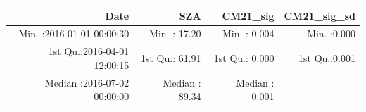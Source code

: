 \documentclass[
  10pt,
  a4paper,oneside]{article}
\begin{document}
\begin{longtable}[]{@{}rrrr@{}}
\toprule
\begin{minipage}[b]{0.33\columnwidth}\raggedleft
Date\strut
\end{minipage} & \begin{minipage}[b]{0.19\columnwidth}\raggedleft
SZA\strut
\end{minipage} & \begin{minipage}[b]{0.19\columnwidth}\raggedleft
CM21\_sig\strut
\end{minipage} & \begin{minipage}[b]{0.19\columnwidth}\raggedleft
CM21\_sig\_sd\strut
\end{minipage}\tabularnewline
\midrule
\endhead
\begin{minipage}[t]{0.33\columnwidth}\raggedleft
Min. :2016-01-01 00:00:30\strut
\end{minipage} & \begin{minipage}[t]{0.19\columnwidth}\raggedleft
Min. : 17.20\strut
\end{minipage} & \begin{minipage}[t]{0.19\columnwidth}\raggedleft
Min. :-0.004\strut
\end{minipage} & \begin{minipage}[t]{0.19\columnwidth}\raggedleft
Min. :0.000\strut
\end{minipage}\tabularnewline
\begin{minipage}[t]{0.33\columnwidth}\raggedleft
1st Qu.:2016-04-01 12:00:15\strut
\end{minipage} & \begin{minipage}[t]{0.19\columnwidth}\raggedleft
1st Qu.: 61.91\strut
\end{minipage} & \begin{minipage}[t]{0.19\columnwidth}\raggedleft
1st Qu.: 0.000\strut
\end{minipage} & \begin{minipage}[t]{0.19\columnwidth}\raggedleft
1st Qu.:0.001\strut
\end{minipage}\tabularnewline
\begin{minipage}[t]{0.33\columnwidth}\raggedleft
Median :2016-07-02 00:00:00\strut
\end{minipage} & \begin{minipage}[t]{0.19\columnwidth}\raggedleft
Median : 89.34\strut
\end{minipage} & \begin{minipage}[t]{0.19\columnwidth}\raggedleft
Median : 0.001\strut
\end{minipage} & \begin{minipage}[t]{0.19\columnwidth}\raggedleft

\end{minipage}
\end{longtable}
\end{document}
